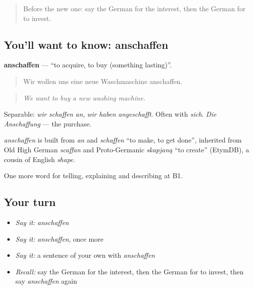 \begin{quote}
Before the new one: say the German for the interest, then the German for to invest.
\end{quote}

\subsection*{You'll want to know: anschaffen}
\textbf{anschaffen} — \textquotedblleft{}to acquire, to buy (something lasting)\textquotedblright{}.

\begin{quote}
Wir wollen uns eine neue Waschmaschine anschaffen.
\end{quote}

\begin{quote}
\emph{We want to buy a new washing machine.}
\end{quote}

Separable: \emph{wir schaffen an}, \emph{wir haben angeschafft}. Often with \emph{sich}. \emph{Die Anschaffung} — the purchase.

\begin{cousinweb}
\emph{anschaffen} is built from \emph{an} and \emph{schaffen} \textquotedblleft{}to make, to get done\textquotedblright{}, inherited from Old High German \emph{scaffan} and Proto-Germanic \emph{skapjaną} \textquotedblleft{}to create\textquotedblright{} (EtymDB), a cousin of English \emph{shape}.
\end{cousinweb}

\begin{grammarlens}[title={What you've built}]
One more word for telling, explaining and describing at B1.
\end{grammarlens}

\subsection*{Your turn}
\begin{itemize}
\raggedright
  \item \emph{Say it:} \emph{anschaffen}
  \item \emph{Say it:} \emph{anschaffen}, once more
  \item \emph{Say it:} a sentence of your own with \emph{anschaffen}
  \item \emph{Recall:} say the German for the interest, then the German for to invest, then say \emph{anschaffen} again
\end{itemize}


